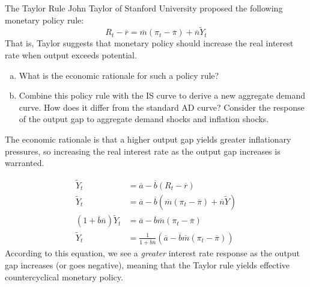 \documentclass[10pt]{extarticle}
\begin{document}
  \begin{problem}{The Taylor Rule}
    John Taylor of Stanford University proposed the following monetary policy rule:
    \[
      R_t - \overline{r} = \overline{m}(\pi_t - \overline{\pi}) + \overline{n}\tilde{Y}_t
    \] 
    That is, Taylor suggests that monetary policy should increase the real interest rate when output exceeds potential.
    \begin{enumerate}[(a)]
      \item What is the economic rationale for such a policy rule?
      \item Combine this policy rule with the IS curve to derive a new aggregate demand curve. How does it differ from the standard AD curve? Consider the response of the output gap to aggregate demand shocks and inflation shocks.
    \end{enumerate}
    \tcblower
    \begin{tcolorbox}[colback = white, title = (a), breakable]
      The economic rationale is that a higher output gap yields greater inflationary pressures, so increasing the real interest rate as the output gap increases is warranted.
    \end{tcolorbox}
    \begin{tcolorbox}[colback = white, title = (b), breakable]
      \begin{align*}
        \tilde{Y}_t &= \overline{a} - \overline{b}(R_t - \overline{r}) \tag*{IS Curve}\\
        \tilde{Y}_t &= \overline{a} - \overline{b}\left(\overline{m}(\pi_t - \overline{\pi}) + \overline{n}\tilde{Y}\right) \tag*{Include Taylor Rule}\\
        (1 + \overline{b}\overline{n}) \tilde{Y}_t &= \overline{a} - \overline{b}\overline{m}\left(\pi_t - \overline{\pi}\right) \\
        \tilde{Y}_t &= \frac{1}{1 + \overline{b}\overline{n}} \left(\overline{a}-\overline{b}\overline{m}(\pi_t - \overline{\pi})\right)
      \end{align*}
      According to this equation, we see a \textit{greater} interest rate response as the output gap increases (or goes negative), meaning that the Taylor rule yields effective countercyclical monetary policy.
    \end{tcolorbox}
  \end{problem}
\end{document}
